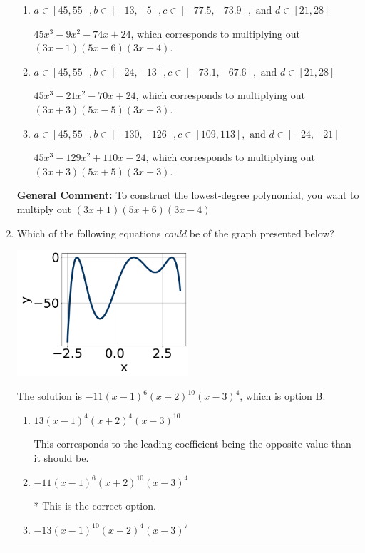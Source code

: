 \documentclass{extbook}[14pt]
\newcommand{\litem}[1]{\item #1

\rule{\textwidth}{0.4pt}}
\begin{document}
\begin{enumerate}
{\begin{enumerate}[label=\Alph*.]
* $45x^{3} +9 x^{2} -74 x -24$, which is the correct option.
\item \( a \in [45, 55], b \in [-13, -5], c \in [-77.5, -73.9], \text{ and } d \in [21, 28] \)

$45x^{3} -9 x^{2} -74 x + 24$, which corresponds to multiplying out $(3x -1)(5x -6)(3x + 4)$.
\item \( a \in [45, 55], b \in [-24, -13], c \in [-73.1, -67.6], \text{ and } d \in [21, 28] \)

$45x^{3} -21 x^{2} -70 x + 24$, which corresponds to multiplying out $(3x + 3)(5x -5)(3x -3)$.
\item \( a \in [45, 55], b \in [-130, -126], c \in [109, 113], \text{ and } d \in [-24, -21] \)

$45x^{3} -129 x^{2} +110 x -24$, which corresponds to multiplying out $(3x + 3)(5x + 5)(3x -3)$.
\end{enumerate}

\textbf{General Comment:} To construct the lowest-degree polynomial, you want to multiply out $(3x + 1)(5x + 6)(3x -4)$
}
\litem{
Which of the following equations \textit{could} be of the graph presented below?

\begin{center}
    \includegraphics[width=0.5\textwidth]{../Figures/polyGraphToFunctionB.png}
\end{center}




The solution is \( -11(x - 1)^{6} (x + 2)^{10} (x - 3)^{4} \), which is option B.\begin{enumerate}[label=\Alph*.]
\item \( 13(x - 1)^{4} (x + 2)^{4} (x - 3)^{10} \)

This corresponds to the leading coefficient being the opposite value than it should be.
\item \( -11(x - 1)^{6} (x + 2)^{10} (x - 3)^{4} \)

* This is the correct option.
\item \( -13(x - 1)^{10} (x + 2)^{4} (x - 3)^{7} \)


\end{enumerate}}
\end{enumerate}
\end{document}
